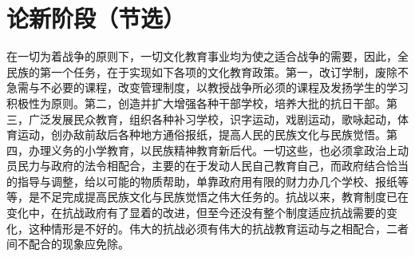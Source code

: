 \section[论新阶段（节选）（一九三八年十一月）]{论新阶段（节选）}


在一切为着战争的原则下，一切文化教育事业均为使之适合战争的需要，因此，全民族的第一个任务，在于实现如下各项的文化教育政策。第一，改订学制，废除不急需与不必要的课程，改变管理制度，以教授战争所必须的课程及发扬学生的学习积极性为原则。第二，创造并扩大增强各种干部学校，培养大批的抗日干部。第三，广泛发展民众教育，组织各种补习学校，识字运动，戏剧运动，歌咏起动，体育运动，创办敌前敌后各种地方通俗报纸，提高人民的民族文化与民族觉悟。第四，办理义务的小学教育，以民族精神教育新后代。一切这些，也必须拿政治上动员民力与政府的法令相配合，主要的在于发动人民自己教育自己，而政府结合恰当的指导与调整，给以可能的物质帮助，单靠政府用有限的财力办几个学校、报纸等等，是不足完成提高民族文化与民族觉悟之伟大任务的。抗战以来，教育制度已在变化中，在抗战政府有了显着的改进，但至今还没有整个制度适应抗战需要的变化，这种情形是不好的。伟大的抗战必须有伟大的抗战教育运动与之相配合，二者间不配合的现象应免除。

